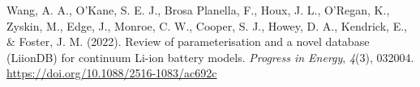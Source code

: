 \documentclass[
]{article}
\newlength{\cslhangindent}
\newenvironment{CSLReferences}[2] %
 {\begin{list}{}{%
  \setlength{\itemindent}{0pt}
  \setlength{\leftmargin}{0pt}
  \setlength{\parsep}{0pt}
  \ifodd #1
   \setlength{\leftmargin}{\cslhangindent}
   \setlength{\itemindent}{-1\cslhangindent}
  \fi
  \setlength{\itemsep}{#2\baselineskip}}}
 {\end{list}}
\begin{document}
\begin{CSLReferences}{1}{0}
Wang, A. A., O'Kane, S. E. J., Brosa Planella, F., Houx, J. L., O'Regan,
K., Zyskin, M., Edge, J., Monroe, C. W., Cooper, S. J., Howey, D. A.,
Kendrick, E., \& Foster, J. M. (2022). Review of parameterisation and a
novel database {(LiionDB)} for continuum {Li-ion} battery models.
\emph{Progress in Energy}, \emph{4}(3), 032004.
\url{https://doi.org/10.1088/2516-1083/ac692c}

\end{CSLReferences}
\end{document}
